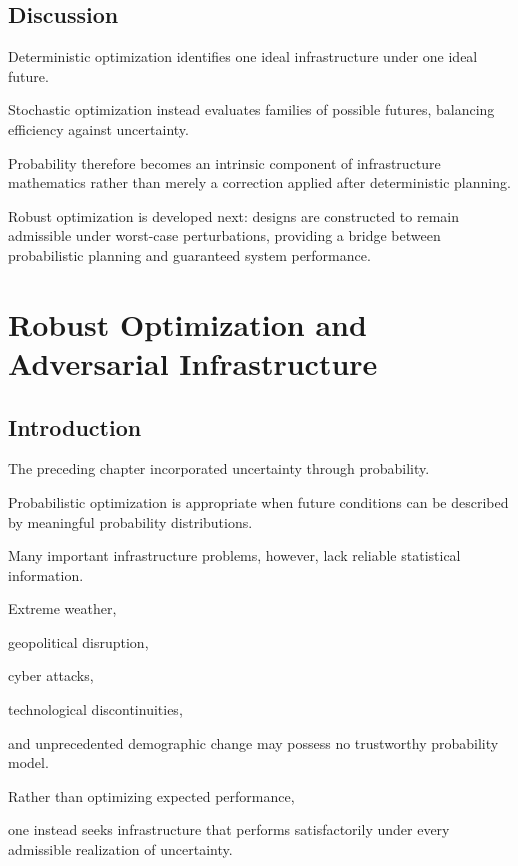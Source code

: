 \documentclass[11pt,fleqn]{book}
\numberwithin{equation}{chapter}
\theoremstyle{plain}
\theoremstyle{definition}
\theoremstyle{remark}
\begin{document}

\section{Discussion}

Deterministic optimization identifies one ideal infrastructure under one
ideal future.

Stochastic optimization instead evaluates families of possible futures,
balancing efficiency against uncertainty.

Probability therefore becomes an intrinsic component of infrastructure
mathematics rather than merely a correction applied after deterministic
planning.

Robust optimization is developed next: designs are
constructed to remain admissible under worst-case perturbations,
providing a bridge between probabilistic planning and guaranteed system
performance.

\chapter{Robust Optimization and Adversarial Infrastructure}

\section{Introduction}

The preceding chapter incorporated uncertainty through probability.

Probabilistic optimization is appropriate when future conditions can be
described by meaningful probability distributions.

Many important infrastructure problems, however, lack reliable
statistical information.

Extreme weather,

geopolitical disruption,

cyber attacks,

technological discontinuities,

and unprecedented demographic change may possess no trustworthy
probability model.

Rather than optimizing expected performance,

one instead seeks infrastructure that performs satisfactorily under every
admissible realization of uncertainty.
\end{document}
